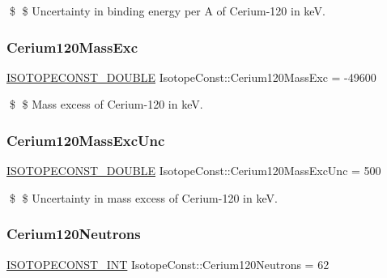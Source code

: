 \$ \$ Uncertainty in binding energy per A of Cerium-\/120 in keV. \mbox{\label{group___isotope_const-_cerium-_ce120_gabe8747594e67ce42e1ebe618900d0939}} 
\subsubsection{\texorpdfstring{Cerium120\+Mass\+Exc}{Cerium120MassExc}}
{\footnotesize\ttfamily \mbox{\hyperlink{group___isotope_const-_macros_ga8f45a7272ce02c0b4c65c44636ed719a}{I\+S\+O\+T\+O\+P\+E\+C\+O\+N\+S\+T\+\_\+\+D\+O\+U\+B\+LE}} Isotope\+Const\+::\+Cerium120\+Mass\+Exc = -\/49600}

\$ \$ Mass excess of Cerium-\/120 in keV. \mbox{\label{group___isotope_const-_cerium-_ce120_ga901c2ab3bae84937c8f5c3952f3e84f4}} 
\subsubsection{\texorpdfstring{Cerium120\+Mass\+Exc\+Unc}{Cerium120MassExcUnc}}
{\footnotesize\ttfamily \mbox{\hyperlink{group___isotope_const-_macros_ga8f45a7272ce02c0b4c65c44636ed719a}{I\+S\+O\+T\+O\+P\+E\+C\+O\+N\+S\+T\+\_\+\+D\+O\+U\+B\+LE}} Isotope\+Const\+::\+Cerium120\+Mass\+Exc\+Unc = 500}

\$ \$ Uncertainty in mass excess of Cerium-\/120 in keV. \mbox{\label{group___isotope_const-_cerium-_ce120_ga28a0d9d85fbe2d843d52637124067c83}} 
\subsubsection{\texorpdfstring{Cerium120\+Neutrons}{Cerium120Neutrons}}
{\footnotesize\ttfamily \mbox{\hyperlink{group___isotope_const-_macros_ga5f18360b3e99483a35c32d789e62621c}{I\+S\+O\+T\+O\+P\+E\+C\+O\+N\+S\+T\+\_\+\+I\+NT}} Isotope\+Const\+::\+Cerium120\+Neutrons = 62}

